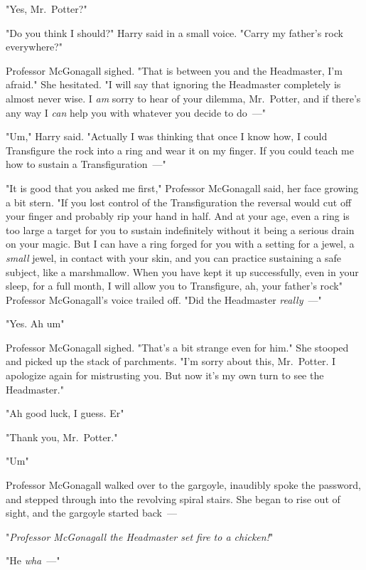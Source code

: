 "Yes, Mr.~Potter?"

"Do you think I should?" Harry said in a small voice. "Carry my father's rock
everywhere?"

Professor McGonagall sighed. "That is between you and the Headmaster, I'm
afraid." She hesitated. "I will say that ignoring the Headmaster completely is
almost never wise. I \emph{am} sorry to hear of your dilemma, Mr.~Potter, and
if there's any way I \emph{can} help you with whatever you decide to do~---"

"Um," Harry said. "Actually I was thinking that once I know how, I could
Transfigure the rock into a ring and wear it on my finger. If you could teach
me how to sustain a Transfiguration~---"

"It is good that you asked me first," Professor McGonagall said, her face
growing a bit stern. "If you lost control of the Transfiguration the reversal
would cut off your finger and probably rip your hand in half. And at your age,
even a ring is too large a target for you to sustain indefinitely without it
being a serious drain on your magic. But I can have a ring forged for you with
a setting for a jewel, a \emph{small} jewel, in contact with your skin, and you
can practice sustaining a safe subject, like a marshmallow. When you have kept
it up successfully, even in your sleep, for a full month, I will allow you to
Transfigure, ah, your father's rock{\el}" Professor McGonagall's voice
trailed off. "Did the Headmaster \emph{really}~---"

"Yes. Ah{\el} um{\el}"

Professor McGonagall sighed. "That's a bit strange even for him." She stooped
and picked up the stack of parchments. "I'm sorry about this, Mr.~Potter. I
apologize again for mistrusting you. But now it's my own turn to see the
Headmaster."

"Ah{\el} good luck, I guess. Er{\el}"

"Thank you, Mr.~Potter."

"Um{\el}"

Professor McGonagall walked over to the gargoyle, inaudibly spoke the password,
and stepped through into the revolving spiral stairs. She began to rise out of
sight, and the gargoyle started back~---

"\emph{Professor McGonagall the Headmaster set fire to a chicken!}"

"He \emph{wha}~---"
